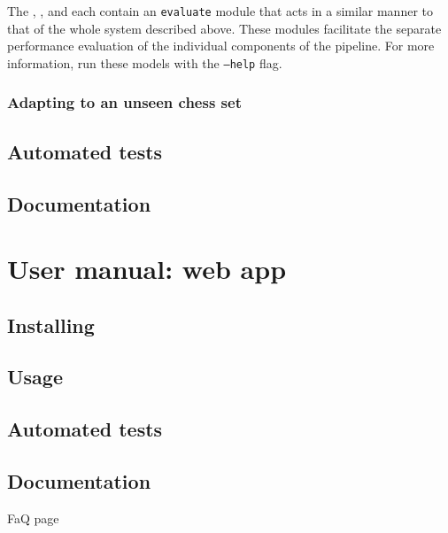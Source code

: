 \documentclass[../../report.tex]{subfiles}
\begin{document}
The , , and  each contain an \texttt{evaluate} module that acts in a similar manner to that of the whole system described above.
These modules facilitate the separate performance evaluation of the individual components of the pipeline.
For more information, run these models with the \texttt{--help} flag.

\subsection{Adapting to an unseen chess set}

\section{Automated tests}
\label{sec:chesscog_tests}

\section{Documentation}
\label{sec:chesscog_documentation}

\chapter{User manual: web app}
\label{chap:user_man_chesscogapp}

\section{Installing}
\section{Usage}
\section{Automated tests}
\label{sec:chesscogapp_tests}
\section{Documentation}
FaQ page
\end{document}
